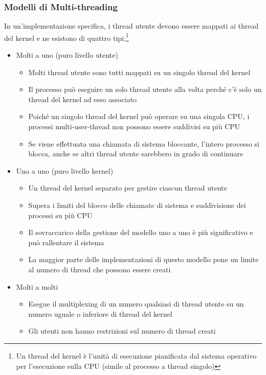 \documentclass{article}
\begin{document}
\subsubsection{Modelli di Multi-threading}
In un'implementazione specifica, i thread utente devono essere mappati ai thread del kernel e ne esistono di quattro tipi:\footnote{Un thread del kernel è l'unità di esecuzione pianificata dal sistema operativo per l'esecuzione sulla CPU (simile al processo a thread singolo)}
\begin{itemize}
    \item Molti a uno (puro livello utente)
        \begin{itemize}
            \item Molti thread utente sono tutti mappati su un singolo thread del kernel
            \item Il processo può eseguire un solo thread utente alla volta perché
            c'è solo un thread del kernel ad esso associato
            \item Poiché un singolo thread del kernel può operare su una singola CPU, i processi multi-user-thread non possono essere suddivisi su più CPU
            \item Se viene effettuata una chiamata di sistema bloccante, l'intero processo si blocca, anche se altri thread utente sarebbero in grado di continuare
        \end{itemize}
    \item Uno a uno (puro livello kernel)
        \begin{itemize}
            \item Un thread del kernel separato per gestire ciascun thread utente
            \item Supera i limiti del blocco delle chiamate di sistema
            e suddivisione dei processi su più CPU
            \item Il sovraccarico della gestione del modello uno a uno è più significativo e può rallentare il sistema
            \item La maggior parte delle implementazioni di questo modello pone un limite al numero di thread che possono essere creati
        \end{itemize}
    \item Molti a molti 
        \begin{itemize}
            \item Esegue il multiplexing di un numero qualsiasi di thread utente su un numero uguale o inferiore di thread del kernel
            \item Gli utenti non hanno restrizioni sul numero di thread creati

\end{itemize}
\end{itemize}
\end{document}
